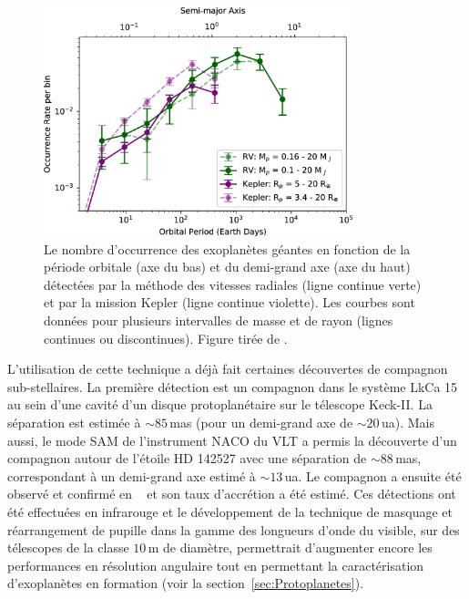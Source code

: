\begin{figure}[ht!]
    \centering
    \includegraphics[width=0.8\textwidth]{Figure_Chap1/Fernandes2019_Figure02.jpg}
    \caption[Le nombre d'occurrence des exoplanètes détectées par la méthode des vitesses radiales et par la mission Kepler en fonction de la période orbitale et du demi-grand axe.]{Le nombre d'occurrence des exoplanètes géantes en fonction de la période orbitale (axe du bas) et du demi-grand axe (axe du haut) détectées par la méthode des vitesses radiales (ligne continue verte) et par la mission Kepler (ligne continue violette). Les courbes sont données pour plusieurs intervalles de masse et de rayon (lignes continues ou discontinues). Figure tirée de \cite{fernandes2019}.}
    \label{fig:Fernandes2019F2}
\end{figure}

L'utilisation de cette technique a déjà fait certaines découvertes de compagnon sub-stellaires. La première détection est un compagnon dans le système LkCa 15 au sein d'une cavité d'un disque protoplanétaire \citep{kraus2012} sur le télescope Keck-II. La séparation est estimée à $\sim 85 \,$mas (pour un demi-grand axe de $\sim 20 \,$ua). Mais aussi, le mode \ac{SAM} de l'instrument \ac{NACO} du \ac{VLT} a permis la découverte d'un compagnon autour de l'étoile HD 142527 \citep{biller2012} avec une séparation de $\sim 88 \,$mas, correspondant à un demi-grand axe estimé à $\sim 13 \,$ua. Le compagnon a ensuite été observé et confirmé en \ha~\citep{close2014} et son taux d'accrétion a été estimé. Ces détections ont été effectuées en infrarouge et le développement de la technique de masquage et réarrangement de pupille dans la gamme des longueurs d'onde du visible, sur des télescopes de la classe $10 \,$m de diamètre, permettrait d'augmenter encore les performances en résolution angulaire tout en permettant la caractérisation d'exoplanètes en formation (voir la section~\ref{sec:Protoplanetes}).


